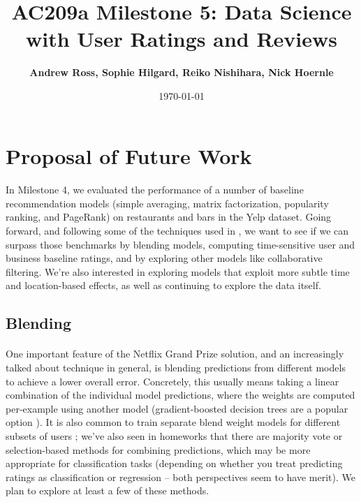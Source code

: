 \documentclass[11pt]{article}
\title{
\vspace{1cm}
\textmd{\textbf{AC209a Milestone 5: Data Science with User Ratings and Reviews}}\\
}
\author{\textbf{Andrew Ross, Sophie Hilgard, Reiko Nishihara, Nick Hoernle}}
\date{\today} %
\begin{document}
\maketitle

\section*{Proposal of Future Work}

\paragraph{} In Milestone 4, we evaluated the performance of a number of baseline recommendation models (simple averaging, matrix factorization, popularity ranking, and PageRank) on restaurants and bars in the Yelp dataset. Going forward, and following some of the techniques used in \cite{koren}, we want to see if we can surpass those benchmarks by blending models, computing time-sensitive user and business baseline ratings, and by exploring other models like collaborative filtering. We're also interested in exploring models that exploit more subtle time and location-based effects, as well as continuing to explore the data itself.

\subsection*{Blending}

\paragraph{} One important feature of the Netflix Grand Prize solution, and an increasingly talked about technique in general, is blending predictions from different models to achieve a lower overall error. Concretely, this usually means taking a linear combination of the individual model predictions, where the weights are computed per-example using another model (gradient-boosted decision trees are a popular option \cite{koren,jahrer}). It is also common to train separate blend weight models for different subsets of users \cite{jahrer}; we've also seen in homeworks that there are majority vote or selection-based methods for combining predictions, which may be more appropriate for classification tasks (depending on whether you treat predicting ratings as classification or regression -- both perspectives seem to have merit). We plan to explore at least a few of these methods.
\end{document}
